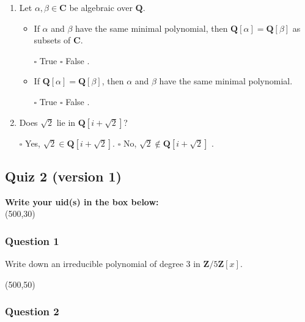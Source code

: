 \documentclass[11pt]{article}
\begin{document}
\begin{enumerate}
\item Let \(\alpha, \beta \in \mathbf{C}\) be algebraic over \(\mathbf{Q}\).

\begin{itemize}
\item If \(\alpha\) and \(\beta\) have the same minimal polynomial, then \(\mathbf{Q}[\alpha] = \mathbf{Q}[\beta]\) as subsets of \(\mathbf{C}\).

\bigskip

\(\square\) True \hfill \(\square\) False \hfill.

\bigskip

\item If \(\mathbf{Q}[\alpha] = \mathbf{Q}[\beta]\), then \(\alpha\) and \(\beta\) have the same minimal polynomial.

\bigskip

\(\square\) True \hfill \(\square\) False \hfill.

\bigskip
\end{itemize}

\item Does \(\sqrt 2\) lie in \(\mathbf{Q}[i + \sqrt 2]\)?

\bigskip

\(\square\) Yes, \(\sqrt 2 \in \mathbf{Q}[i+\sqrt 2]\). \hfill \(\square\) No, \(\sqrt 2 \not\in \mathbf{Q}[i+\sqrt 2]\) \hfill.

\bigskip
\end{enumerate}
\subsection{Quiz 2 (version 1)}
\label{sec:org4947bb9}
\vspace{1cm}

\noindent
\textbf{Write your uid(s) in the box below:}\\
\framebox(500,30)

\vspace{1cm}
\subsubsection{Question 1}
\label{sec:org7eab932}

Write down an irreducible polynomial of degree 3 in \(\mathbf{Z}/5 \mathbf{Z}[x]\).

\noindent
\framebox(500,50)

\vspace{1cm}
\subsubsection{Question 2}
\label{sec:orgcd4eba1}
\end{document}
